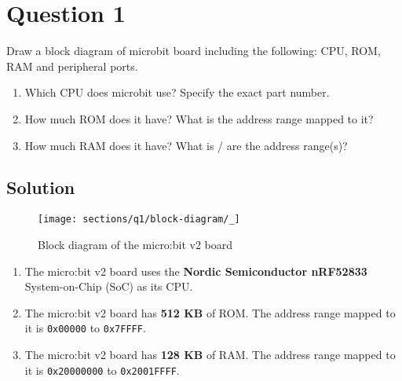 \section*{Question 1}

Draw a block diagram of microbit board including the following: CPU, ROM, RAM and peripheral ports.

\begin{enumerate}[label = (\alph*)]
    \item Which CPU does microbit use? Specify the exact part number.
    \item How much ROM does it have? What is the address range mapped to it?
    \item How much RAM does it have? What is / are the address range(s)?
\end{enumerate}

\subsection*{Solution}

\begin{figure*}[htbp]
    \centering
    \texttt{[image: sections/q1/block-diagram/\_]}
    \caption{
        Block diagram of the micro:bit v2 board
    }\label{fig:block-diagram-microbit}
\end{figure*}

\newcommand{\hex}[1]{\texttt{#1}}
\begin{enumerate}[label = (\alph*)]
    \item The micro:bit v2 board uses the \textbf{Nordic Semiconductor nRF52833} System-on-Chip (SoC) as its CPU.\@
    \item The micro:bit v2 board has \textbf{512 KB} of ROM.\@
          The address range mapped to it is \hex{0x00000} to \hex{0x7FFFF}.
    \item The micro:bit v2 board has \textbf{128 KB} of RAM. The address range mapped to it is \hex{0x20000000} to \hex{0x2001FFFF}.
\end{enumerate}
